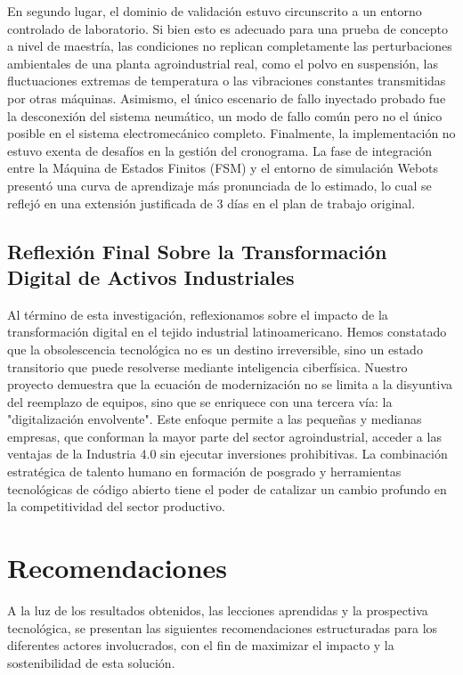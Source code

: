 En segundo lugar, el dominio de validación estuvo circunscrito a un entorno controlado de laboratorio. Si bien esto es adecuado para una prueba de concepto a nivel de maestría, las condiciones no replican completamente las perturbaciones ambientales de una planta agroindustrial real, como el polvo en suspensión, las fluctuaciones extremas de temperatura o las vibraciones constantes transmitidas por otras máquinas. Asimismo, el único escenario de fallo inyectado probado fue la desconexión del sistema neumático, un modo de fallo común pero no el único posible en el sistema electromecánico completo. Finalmente, la implementación no estuvo exenta de desafíos en la gestión del cronograma. La fase de integración entre la Máquina de Estados Finitos (FSM) y el entorno de simulación Webots presentó una curva de aprendizaje más pronunciada de lo estimado, lo cual se reflejó en una extensión justificada de 3 días en el plan de trabajo original.

\subsection{Reflexión Final Sobre la Transformación Digital de Activos Industriales}
Al término de esta investigación, reflexionamos sobre el impacto de la transformación digital en el tejido industrial latinoamericano. Hemos constatado que la obsolescencia tecnológica no es un destino irreversible, sino un estado transitorio que puede resolverse mediante inteligencia ciberfísica. Nuestro proyecto demuestra que la ecuación de modernización no se limita a la disyuntiva del reemplazo de equipos, sino que se enriquece con una tercera vía: la "digitalización envolvente". Este enfoque permite a las pequeñas y medianas empresas, que conforman la mayor parte del sector agroindustrial, acceder a las ventajas de la Industria 4.0 sin ejecutar inversiones prohibitivas. La combinación estratégica de talento humano en formación de posgrado y herramientas tecnológicas de código abierto tiene el poder de catalizar un cambio profundo en la competitividad del sector productivo.

\section{Recomendaciones}

A la luz de los resultados obtenidos, las lecciones aprendidas y la prospectiva tecnológica, se presentan las siguientes recomendaciones estructuradas para los diferentes actores involucrados, con el fin de maximizar el impacto y la sostenibilidad de esta solución.

